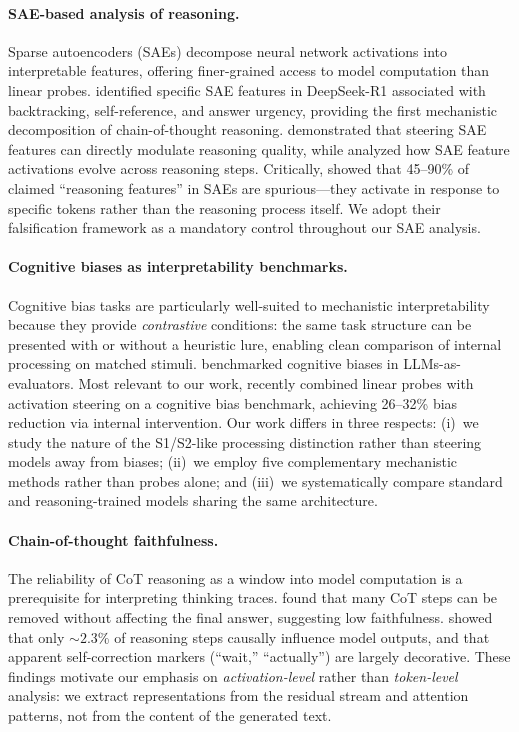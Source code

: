 \paragraph{SAE-based analysis of reasoning.}
Sparse autoencoders (SAEs) decompose neural network activations into
interpretable features, offering finer-grained access to model computation
than linear probes.
\citet{goodfire2025r1} identified specific SAE features in DeepSeek-R1
associated with backtracking, self-reference, and answer urgency, providing
the first mechanistic decomposition of chain-of-thought reasoning.
\citet{fang2026sae} demonstrated that steering SAE features can directly
modulate reasoning quality, while \citet{yang2026step} analyzed how SAE
feature activations evolve across reasoning steps.
Critically, \citet{ma2026falsification} showed that 45--90\% of claimed
``reasoning features'' in SAEs are spurious---they activate in response to
specific tokens rather than the reasoning process itself.  We adopt their
falsification framework as a mandatory control throughout our SAE analysis.

\paragraph{Cognitive biases as interpretability benchmarks.}
Cognitive bias tasks are particularly well-suited to mechanistic interpretability
because they provide \emph{contrastive} conditions: the same task structure can
be presented with or without a heuristic lure, enabling clean comparison of
internal processing on matched stimuli.
\citet{rao2024cobbler} benchmarked cognitive biases in LLMs-as-evaluators.
Most relevant to our work, \citet{huang2026cogbias} recently combined linear
probes with activation steering on a cognitive bias benchmark, achieving
26--32\% bias reduction via internal intervention.  Our work differs in three
respects: (i)~we study the nature of the S1/S2-like processing distinction
rather than steering models away from biases; (ii)~we employ five
complementary mechanistic methods rather than probes alone; and (iii)~we
systematically compare standard and reasoning-trained models sharing the
same architecture.

\paragraph{Chain-of-thought faithfulness.}
The reliability of CoT reasoning as a window into model computation is a
prerequisite for interpreting thinking traces.
\citet{lanham2023measuring} found that many CoT steps can be removed without
affecting the final answer, suggesting low faithfulness.
\citet{jiang2025aha} showed that only ${\sim}2.3$\% of reasoning steps
causally influence model outputs, and that apparent self-correction markers
(``wait,'' ``actually'') are largely decorative.
These findings motivate our emphasis on \emph{activation-level} rather than
\emph{token-level} analysis: we extract representations from the residual
stream and attention patterns, not from the content of the generated text.
